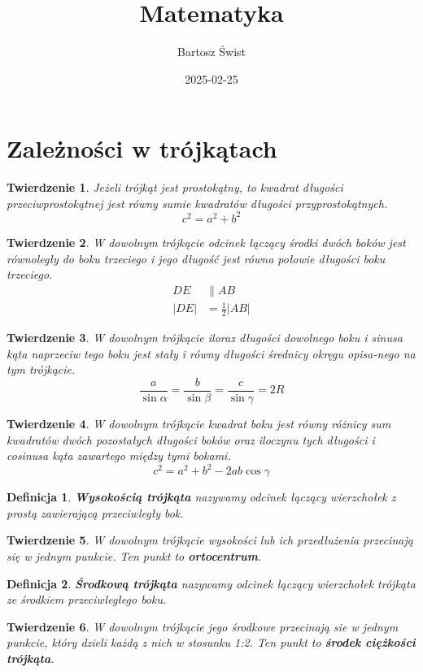 \documentclass{article}
\title{Matematyka}
\date{2025-02-25}
\author{Bartosz Świst}
\numberwithin{equation}{section}
\newtheorem*{definition}{Definicja}
\newtheorem{theorem}{Twierdzenie}[section]
\begin{document}
  \maketitle
  \newpage

  \section{Zależności w trójkątach}
    \begin{theorem}
      Jeżeli trójkąt jest prostokątny, to kwadrat długości przeciwprostokątnej jest równy sumie kwadratów długości przyprostokątnych.
      \begin{equation}
        c^2 = a^2 + b^2
      \end{equation}
    \end{theorem}
    \begin{theorem}
      W dowolnym trójkącie odcinek łączący środki dwóch boków jest równoległy do boku trzeciego i jego długość jest równa połowie długości boku trzeciego.
      \begin{equation}
        \begin{aligned}
          DE &\parallel AB\\
          |DE| &= \frac 12|AB|
        \end{aligned}
      \end{equation}
    \end{theorem}
    \begin{theorem}
      W dowolnym trójkącie iloraz długości dowolnego boku i sinusa kąta naprzeciw tego boku jest stały i równy długości średnicy okręgu opisa-\-nego na tym trójkącie.
      \begin{equation}
        \frac{a}{\sin\alpha} = \frac{b}{\sin\beta} = \frac{c}{\sin\gamma} = 2R
      \end{equation}
    \end{theorem}
    \begin{theorem}
      W dowolnym trójkącie kwadrat boku jest równy różnicy sum kwadratów dwóch pozostałych długości boków oraz iloczynu tych długości i cosinusa kąta zawartego między tymi bokami.
      \begin{equation}
        c^2 = a^2 + b^2 - 2ab\cos\gamma
      \end{equation}
    \end{theorem}
    \begin{definition}
      \textbf{Wysokością trójkąta} nazywamy odcinek łączący wierzchołek z prostą zawierającą przeciwległy bok.
    \end{definition}
    \begin{theorem}
      W dowolnym trójkącie wysokości lub ich przedłużenia przecinają się w jednym punkcie. Ten punkt to \textbf{ortocentrum}.
    \end{theorem}
    \begin{definition}
      \textbf{Środkową trójkąta} nazywamy odcinek łączący wierzchołek trójkąta ze środkiem przeciwległego boku.
    \end{definition}
    \begin{theorem}
      W dowolnym trójkącie jego środkowe przecinają sie w jednym punkcie, który dzieli każdą z nich w stosunku 1:2. Ten punkt to \textbf{środek ciężkości trójkąta}.
    \end{theorem}
\end{document}

